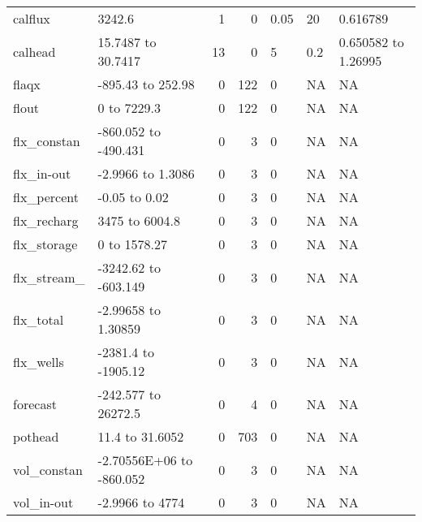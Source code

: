 \documentclass{article}
\begin{document}
\begin{center}
\begin{landscape}
\begin{longtable}{llrrlll}
\bottomrule
\endlastfoot
    calflux &                   3242.6 &                1 &            0 &   0.05 &                 20 &            0.616789 \\
    calhead &       15.7487 to 30.7417 &               13 &            0 &      5 &                0.2 & 0.650582 to 1.26995 \\
      flaqx &        -895.43 to 252.98 &                0 &          122 &      0 &                 NA &                  NA \\
      flout &              0 to 7229.3 &                0 &          122 &      0 &                 NA &                  NA \\
flx\_constan &     -860.052 to -490.431 &                0 &            3 &      0 &                 NA &                  NA \\
 flx\_in-out &        -2.9966 to 1.3086 &                0 &            3 &      0 &                 NA &                  NA \\
flx\_percent &           -0.05 to  0.02 &                0 &            3 &      0 &                 NA &                  NA \\
flx\_recharg &           3475 to 6004.8 &                0 &            3 &      0 &                 NA &                  NA \\
flx\_storage &             0 to 1578.27 &                0 &            3 &      0 &                 NA &                  NA \\
flx\_stream\_ &     -3242.62 to -603.149 &                0 &            3 &      0 &                 NA &                  NA \\
  flx\_total &      -2.99658 to 1.30859 &                0 &            3 &      0 &                 NA &                  NA \\
  flx\_wells &      -2381.4 to -1905.12 &                0 &            3 &      0 &                 NA &                  NA \\
   forecast &      -242.577 to 26272.5 &                0 &            4 &      0 &                 NA &                  NA \\
    pothead &          11.4 to 31.6052 &                0 &          703 &      0 &                 NA &                  NA \\
vol\_constan & -2.70556E+06 to -860.052 &                0 &            3 &      0 &                 NA &                  NA \\
 vol\_in-out &         -2.9966 to  4774 &                0 &            3 &      0 &                 NA &                  NA \\

\end{longtable}
\end{landscape}
\end{center}
\end{document}
